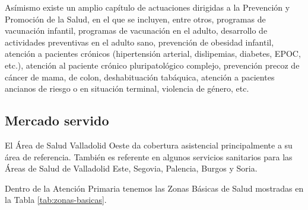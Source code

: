 Asímismo existe un amplio capítulo de actuaciones dirigidas a la Prevención y Promoción de la Salud, en el que se incluyen, entre otros, programas de vacunación infantil, programas de vacunación en el adulto, desarrollo de actividades preventivas en el adulto sano, prevención de obesidad infantil, atención a pacientes crónicos (hipertensión arterial, dislipemias, diabetes, EPOC, etc.), atención al paciente crónico pluripatológico complejo, prevención precoz de cáncer de mama, de colon, deshabituación tabáquica, atención a pacientes ancianos de riesgo o en situación terminal, violencia de género, etc.

\subsection{Mercado servido}

El Área de Salud Valladolid Oeste da cobertura asistencial principalmente a su área de referencia.
También es referente en algunos servicios sanitarios para las Áreas de Salud de Valladolid Este, Segovia, Palencia, Burgos y Soria.

Dentro de la Atención Primaria tenemos las Zonas Básicas de Salud mostradas en la Tabla \ref{tab:zonas-basicas}.

